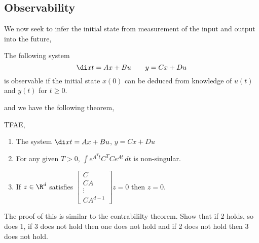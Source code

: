 \subsection{Observability}
We now seek to infer the initial state from measurement of the input and output into the future,
\begin{ndefi}[Observable]
  The following system
  $$ \di x t = Ax + Bu \qquad y = Cx + Du $$
  is observable if the initial state $x(0)$ can be deduced from knowledge of $u(t)$ and $y(t)$ for $t \ge 0$.
\end{ndefi}
and we have the following theorem,
\begin{nthm}
  TFAE,
  \begin{enumerate}
    \item The system $\di x t = Ax + Bu$, $y = Cx + Du$
    \item For any given $T > 0$, $\int e^{A^Tt}C^TCe^{At}\,dt$ is non-singular.
    \item If $z \in \R^d$ satisfies $\begin{bmatrix}
      C \\ CA \\ \vdots \\ CA^{d-1}
    \end{bmatrix}z = 0$ then $z = 0$.
  \end{enumerate}
\end{nthm}
The proof of this is similar to the contrabililty theorem. Show that if 2 holds, so does 1, if 3 does not hold then one does not hold and if 2 does not hold then 3 does not hold.
